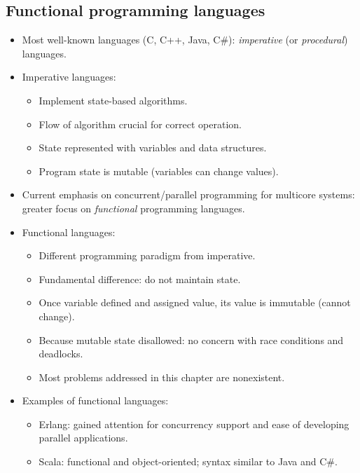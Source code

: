 \subsection{Functional programming languages}
\begin{itemize}
    \item Most well-known languages (C, C++, Java, C\#): \textit{imperative} (or \textit{procedural}) languages.
    \item Imperative languages:
    \begin{itemize}
        \item Implement state-based algorithms.
        \item Flow of algorithm crucial for correct operation.
        \item State represented with variables and data structures.
        \item Program state is mutable (variables can change values).
    \end{itemize}
    \item Current emphasis on concurrent/parallel programming for multicore systems: greater focus on \textit{functional} programming languages.
    \item Functional languages:
    \begin{itemize}
        \item Different programming paradigm from imperative.
        \item Fundamental difference: do not maintain state.
        \item Once variable defined and assigned value, its value is immutable (cannot change).
        \item Because mutable state disallowed: no concern with race conditions and deadlocks.
        \item Most problems addressed in this chapter are nonexistent.
    \end{itemize}
    \item Examples of functional languages:
    \begin{itemize}
        \item Erlang: gained attention for concurrency support and ease of developing parallel applications.
        \item Scala: functional and object-oriented; syntax similar to Java and C\#.
    \end{itemize}
\end{itemize}

